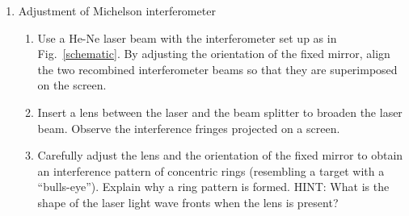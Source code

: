 \begin{enumerate}

\item Adjustment of Michelson interferometer

\begin{enumerate}
\item Use a He-Ne laser beam with the interferometer set up as 
in Fig.~\ref{schematic}. By adjusting the orientation of the fixed mirror, 
align the two recombined interferometer beams so that they are 
superimposed on the screen. 
\item Insert a lens between the laser and the beam splitter to 
broaden the laser beam. Observe the interference fringes projected 
on a screen.
\item Carefully adjust the lens and the orientation of the fixed 
mirror to obtain an interference pattern of concentric rings 
(resembling a target with a ``bulls-eye''). Explain 
why a ring pattern is formed. HINT: What is the shape of the 
laser light wave fronts when the lens is present?
\end{enumerate}



%



 


\end{enumerate}
